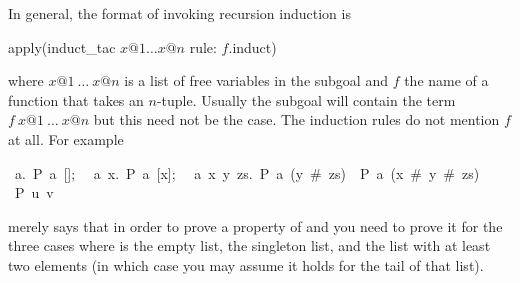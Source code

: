 \begin{isabelle}
\begin{isamarkuptext}
In general, the format of invoking recursion induction is
\begin{ttbox}
apply(induct_tac \(x@1 \dots x@n\) rule: \(f\).induct)
\end{ttbox}%
where $x@1~\dots~x@n$ is a list of free variables in the subgoal and $f$ the
name of a function that takes an $n$-tuple. Usually the subgoal will
contain the term $f~x@1~\dots~x@n$ but this need not be the case. The
induction rules do not mention $f$ at all. For example 
\begin{isabellepar}%
{\isasymlbrakk}~{\isasymAnd}a.~P~a~[];\isanewline
~~{\isasymAnd}a~x.~P~a~[x];\isanewline
~~{\isasymAnd}a~x~y~zs.~P~a~(y~\#~zs)~{\isasymLongrightarrow}~P~a~(x~\#~y~\#~zs){\isasymrbrakk}\isanewline
{\isasymLongrightarrow}~P~u~v%
\end{isabellepar}%
merely says that in order to prove a property  of  and
 you need to prove it for the three cases where  is the
empty list, the singleton list, and the list with at least two elements
(in which case you may assume it holds for the tail of that list).%
\end{isamarkuptext}%
\end{isabelle}%
